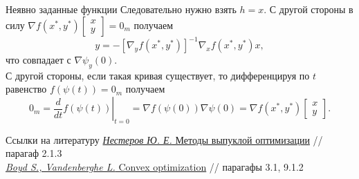 \documentclass[10pt, handout]{beamer}
\begin{document}
\begin{frame}{Неявно заданные функции}
Следовательно нужно взять $h=x$. С другой стороны в силу $\nabla f(x^*, y^*)\left[\begin{array}{ll}
x \\ y
\end{array}\right]=0_m$ получаем
$$
y=-[\nabla_yf(x^*, y^*)]^{-1}\nabla_xf(x^*, y^*)x,
$$
что совпадает с $\nabla \psi_y(0)$. \\
\pause
С другой стороны, если такая кривая существует, то дифференцируя по $t$ равенство $f(\psi(t))=0_m$ получаем
$$
0_m=\left.\frac{d}{dt}f(\psi(t))\right|_{t=0}=\nabla f(\psi(0))\nabla\psi(0)=\nabla f(x^*, y^*)\left[\begin{array}{ll}
x \\ y
\end{array}\right].
$$
\end{frame}

\begin{frame}{Ссылки на литературу}
\href{http://premolab.ru/pub_files/pub5/MnexoB89z7.pdf}{\textit{Нестеров Ю. Е.} 
Методы выпуклой оптимизации} // парагаф 2.1.3 \\
\vspace{1em}
\href{https://web.stanford.edu/~boyd/cvxbook/bv_cvxbook.pdf}{\textit{Boyd S., Vandenberghe L.} 
Convex optimization} // парагафы 3.1, 9.1.2 \\
\end{frame}
\end{document}

